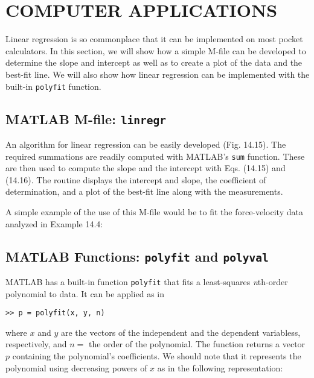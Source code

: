 \documentclass[../main.tex]{subfiles}
\begin{document}
\label{cha:cha_P_14_5}
\section{COMPUTER APPLICATIONS}

\noindent Linear regression is so commonplace that it can be implemented on most pocket calculators. In this section, we will show how a simple M-file can be developed to determine the slope and intercept as well as to create a plot of the data and the best-fit line. We will also show how linear regression can be implemented with the built-in \texttt{polyfit} function.

\label{cha:cha_P_14_5_1}
\subsection{MATLAB M-file: \texttt{linregr}}
\noindent An algorithm for linear regression can be easily developed (Fig. 14.15). The required summations are readily computed with MATLAB's \texttt{sum} function. These are then used to compute the slope and the intercept with Eqs. (14.15) and (14.16). The routine displays the intercept and slope, the coefficient of determination, and a plot of the best-fit line along with the measurements.


A simple example of the use of this M-file would be to fit the force-velocity data analyzed in Example 14.4:



\label{cha:cha_P_14_5_2} %
\subsection{MATLAB Functions: \texttt{polyfit} and \texttt{polyval}}

\noindent MATLAB has a built-in function \texttt{polyfit} that fits a least-squares \textit{n}th-order polynomial to data. It can be applied as in

\begin{lstlisting}[numbers=none]
>> p = polyfit(x, y, n)
\end{lstlisting}

\noindent where $x$ and $y$ are the vectors of the independent and the dependent variabless, respectively, and $n =$ the order of the polynomial. The function returns a vector $p$ containing the polynomial's coefficients. We should note that it represents the polynomial using decreasing powers of $x$ as in the following representation:
\end{document}
